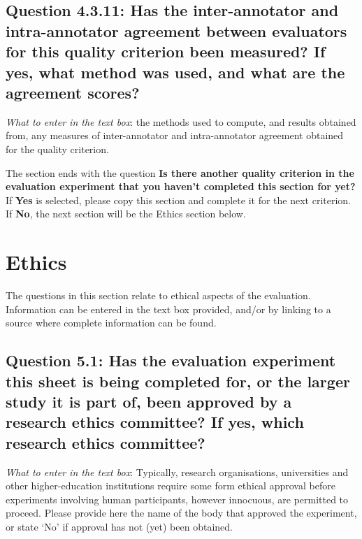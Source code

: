 \documentclass[11pt,a4paper]{article}
\begin{document}
\vspace{-.3cm}
\subsection*{Question 4.3.11:  Has the inter-annotator and intra-annotator agreement between evaluators for this quality criterion been measured? If yes, what method was used, and what are the agreement scores?}

\noindent\textit{What to enter in the text box}: the methods used to compute, and results obtained from, any measures of inter-annotator and intra-annotator agreement obtained for the quality criterion.

\vspace{.3cm}
\noindent The section ends with the question \textbf{Is there another quality criterion in the evaluation experiment that you haven't completed this section for yet?} If \textbf{Yes} is selected, please copy this section and complete it for the next criterion. If \textbf{No}, the next section will be the Ethics section below.

\section{Ethics}\label{sec:ethics}

The questions in this section relate to ethical aspects of the evaluation. Information can be entered in the text box provided, and/or by linking to a source where complete information can be found.

\vspace{-.3cm}
\subsection*{Question 5.1: Has the evaluation experiment this sheet is being completed for, or the larger study it is part of, been approved by a research ethics committee? If yes, which research ethics committee?}
\vspace{-.1cm}


\vspace{.3cm}
\noindent\textit{What to enter in the text box}: Typically, research organisations, universities and other higher-education institutions require some form ethical approval before experiments involving human participants, however innocuous, are permitted to proceed. Please provide here the name of the body that approved the experiment, or state `No' if approval has not (yet) been obtained.
\end{document}
